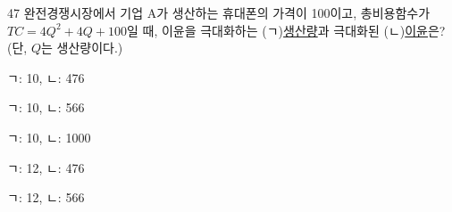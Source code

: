 \begin{question}{47}
완전경쟁시장에서 기업 A가 생산하는 휴대폰의 가격이 100이고, 총비용함수가 $TC=4Q^{2}+4Q+100$일 때, 이윤을 극대화하는 (ㄱ)\uline{생산량}과 극대화된 (ㄴ)\uline{이윤}은? (단, $Q$는 생산량이다.)
\begin{choices}
  \item ㄱ: 10, ㄴ: 476
  \item ㄱ: 10, ㄴ: 566
  \item ㄱ: 10, ㄴ: 1000
  \item ㄱ: 12, ㄴ: 476
  \item ㄱ: 12, ㄴ: 566
\end{choices}
\end{question}
